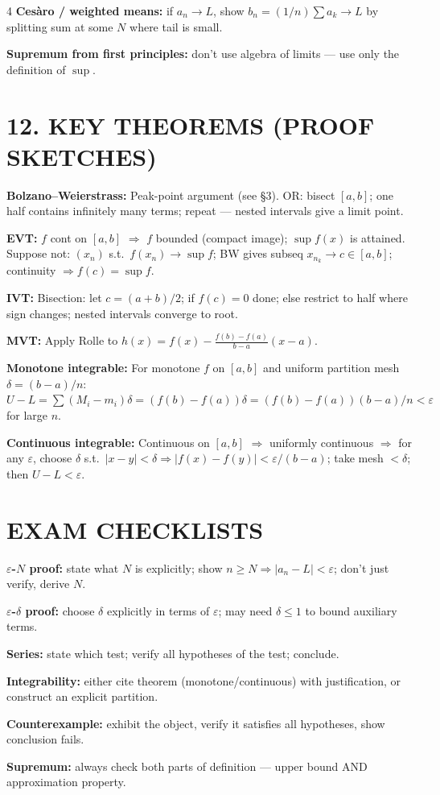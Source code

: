 \documentclass[8pt,a4paper,landscape]{extarticle}
\begin{document}
\begin{multicols}{4}
\textbf{Ces\`aro / weighted means:} if $a_n\to L$, show $b_n=(1/n)\sum a_k\to L$ by splitting sum at some $N$ where tail is small.

\textbf{Supremum from first principles:} don't use algebra of limits --- use only the definition of $\sup$.

\section*{12. KEY THEOREMS (PROOF SKETCHES)}

\textbf{Bolzano--Weierstrass:}
Peak-point argument (see \S3). OR: bisect $[a,b]$; one half contains infinitely many terms; repeat --- nested intervals give a limit point.

\textbf{EVT:} $f$ cont on $[a,b]$ $\Rightarrow$ $f$ bounded (compact image); $\sup f(x)$ is attained. Suppose not: $(x_n)$ s.t.\ $f(x_n)\to\sup f$; BW gives subseq $x_{n_k}\to c\in[a,b]$; continuity $\Rightarrow f(c)=\sup f$.

\textbf{IVT:} Bisection: let $c=(a+b)/2$; if $f(c)=0$ done; else restrict to half where sign changes; nested intervals converge to root.

\textbf{MVT:} Apply Rolle to $h(x)=f(x)-\frac{f(b)-f(a)}{b-a}(x-a)$.

\textbf{Monotone integrable:} For monotone $f$ on $[a,b]$ and uniform partition mesh $\delta=(b-a)/n$:
$U-L=\sum(M_i-m_i)\delta=(f(b)-f(a))\delta=(f(b)-f(a))(b-a)/n<\varepsilon$ for large $n$.

\textbf{Continuous integrable:} Continuous on $[a,b]$ $\Rightarrow$ uniformly continuous $\Rightarrow$ for any $\varepsilon$, choose $\delta$ s.t.\ $|x-y|<\delta\Rightarrow|f(x)-f(y)|<\varepsilon/(b-a)$; take mesh $<\delta$; then $U-L<\varepsilon$.

\section*{EXAM CHECKLISTS}

\textbf{$\varepsilon$-$N$ proof:} state what $N$ is explicitly; show $n\geq N\Rightarrow|a_n-L|<\varepsilon$; don't just verify, derive $N$.

\textbf{$\varepsilon$-$\delta$ proof:} choose $\delta$ explicitly in terms of $\varepsilon$; may need $\delta\leq1$ to bound auxiliary terms.

\textbf{Series:} state which test; verify all hypotheses of the test; conclude.

\textbf{Integrability:} either cite theorem (monotone/continuous) with justification, or construct an explicit partition.

\textbf{Counterexample:} exhibit the object, verify it satisfies all hypotheses, show conclusion fails.

\textbf{Supremum:} always check both parts of definition --- upper bound AND approximation property.

\end{multicols}
\end{document}
